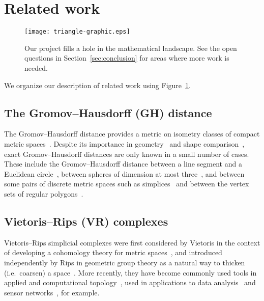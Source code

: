 \documentclass[11pt, reqno, english]{amsart}
\begin{document}
\section{Related work}
\label{sec:related}

\begin{figure}[htb]
\centering
\texttt{[image: triangle-graphic.eps]}
\caption{Our project fills a hole in the mathematical landscape.
See the open questions in Section~\ref{sec:conclusion} for areas where more work is needed.}
\label{fig:triangle-graphic}
\end{figure}

We organize our description of related work using Figure~\ref{fig:triangle-graphic}.


\subsection*{The Gromov--Hausdorff (GH) distance}

The Gromov--Hausdorff distance provides a metric on isometry classes of compact metric spaces~\cite{edwards1975structure,gromov1981groups,gromov1981structures,tuzhilin2016invented}.
Despite its importance in geometry~\cite{BuragoBuragoIvanov,cheeger1997structure,colding1996large,petersen2006riemannian} and shape comparison~\cite{ms04,ms05,memoli2007use}, exact Gromov--Hausdorff distances are only known in a small number of cases.
These include the Gromov--Hausdorff distance between a line segment and a Euclidean circle~\cite{ji2021gromov}, between spheres of dimension at most three~\cite{lim2021gromov}, and between some pairs of discrete metric spaces such as simplices~\cite{memoli2012some,ivanov2019gromov} and between the vertex sets of regular polygons~\cite{lim2021gromov,talipov2022gromov}.


\subsection*{Vietoris--Rips (VR) complexes}

Vietoris--Rips simplicial complexes were first considered by Vietoris in the context of developing a cohomology theory for metric spaces~\cite{lefschetz1942algebraic,Vietoris27}, and introduced independently by Rips in geometric group theory as a natural way to thicken (i.e.\ coarsen) a space~\cite{bridson2011metric,Gromov}.
More recently, they have become commonly used tools in applied and computational topology~\cite{edelsbrunner2000topological,EdelsbrunnerHarer}, used in applications to
data analysis~\cite{Carlsson2009,CarlssonIshkhanovDeSilvaZomorodian2008,ghrist2008barcodes} and sensor networks~\cite{Coordinate-free,de2007coverage}, for example.
\end{document}
